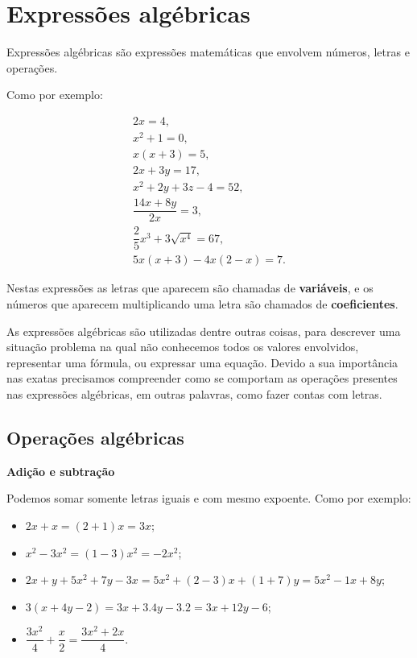 \chapter{Expressões algébricas}

   \vskip0.3cm
 \colorbox{azul}{
 \begin{minipage}{0.9\linewidth}
 \begin{center}
  Expressões algébricas são expressões matemáticas que envolvem números, letras e operações.
 \end{center}
 \end{minipage}}
 \vskip0.3cm

 Como por exemplo:

 \begin{eqnarray*}
  2x=4,\\
  x^2+1=0,\\
  x(x+3)=5,\\
  2x+3y=17,\\
  x^2 + 2y + 3z -4= 52, \\
  \dfrac{14x + 8y}{2x}= 3, \\
  \dfrac{2}{5}x^3 + 3\sqrt{x^4}= 67, \\
  5x(x+3)-4x(2-x)=7.
 \end{eqnarray*}

 Nestas expressões as letras que aparecem são chamadas de \textbf{variáveis}, e os números que aparecem multiplicando uma letra são chamados de \textbf{coeficientes}.

 As expressões algébricas são utilizadas dentre outras coisas, para descrever uma situação problema na qual não conhecemos todos os valores envolvidos, representar uma fórmula, ou expressar uma equação. Devido a sua importância nas exatas precisamos compreender como se comportam as operações presentes nas expressões algébricas, em outras palavras, como fazer contas com letras.

\section{Operações algébricas}

 \vskip0.3cm

 \textbf{Adição e subtração}

 Podemos somar somente letras iguais e com mesmo expoente. Como por exemplo:

 \begin{itemize}
  \item $2x + x= (2+1)x= 3x$;
  \item $x^2 - 3x^2= (1-3)x^2= -2x^2$;
  \item $2x + y + 5x^2 + 7y - 3x= 5x^2 + (2-3)x + (1+7)y= 5x^2 - 1x + 8y$;
  \item $3(x+ 4y-2)= 3x + 3.4y - 3.2= 3x + 12y - 6$;
  \item $\dfrac{3x^2}{4}+\dfrac{x}{2}= \dfrac{3x^2 + 2x}{4}$.
 \end{itemize}

